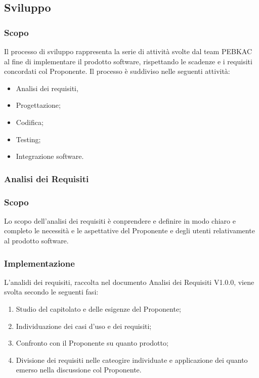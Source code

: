 \subsection{Sviluppo}
\subsubsection{Scopo}
Il processo di sviluppo rappresenta la serie di attività svolte dal team PEBKAC al fine di implementare il prodotto software, rispettando le scadenze e i requisiti concordati col Proponente. 
Il processo è suddiviso nelle seguenti attività:
\begin{itemize}
    \item Analisi dei requisiti,
    \item Progettazione;
    \item Codifica;
    \item Testing;
    \item Integrazione software.
\end{itemize}

\subsubsection{Analisi dei Requisiti}
\subsubsection{Scopo}
Lo scopo dell'analisi dei requisiti è conprendere e definire in modo chiaro e completo le necessità e le aspettative del Proponente e degli utenti relativamente al prodotto software.
\subsubsection{Implementazione}
L'analidi dei requisiti, raccolta nel documento Analisi dei Requisiti V1.0.0, viene svolta secondo le seguenti fasi:
\begin{enumerate}
    \item Studio del capitolato e delle esigenze del Proponente;
    \item Individuazione dei casi d'uso e dei requisiti;
    \item Confronto con il Proponente su quanto prodotto;
    \item Divisione dei requisiti nelle cateogire individuate e applicazione dei quanto emerso nella discussione col Proponente.
\end{enumerate}

